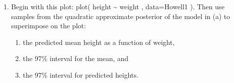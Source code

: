 \documentclass[
]{book}
\providecommand{\tightlist}{%
  \setlength{\itemsep}{0pt}\setlength{\parskip}{0pt}}
\begin{document}
\begin{enumerate}
\def\labelenumi{(\alph{enumi})}
\setcounter{enumi}{1}
\tightlist
\item
  Begin with this plot: plot( height \textasciitilde{} weight , data=Howell1 ). Then use samples from the quadratic approximate posterior of the model in (a) to superimpose on the plot:

  \begin{enumerate}
  \def\labelenumii{(\arabic{enumii})}
  \tightlist
  \item
    the predicted mean height as a function of weight,
  \item
    the 97\% interval for the mean, and
  \item
    the 97\% interval for predicted heights.
  \end{enumerate}
\end{enumerate}
\end{document}
